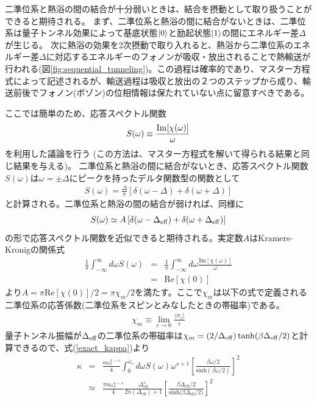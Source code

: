 二準位系と熱浴の間の結合が十分弱いときは、結合を摂動として取り扱うことができると期待される。
まず、二準位系と熱浴の間に結合がないときは、二準位系は量子トンネル効果によって基底状態$\ket{0}$と励起状態$\ket{1}$の間にエネルギー差$\Delta$が生じる。
次に熱浴の効果を2次摂動で取り入れると、熱浴から二準位系のエネルギー差$\Delta$に対応するエネルギーのフォノンが吸収・放出されることで熱輸送が行われる(図\ref{fig:sequential_tunneling})。この過程は確率的であり、マスター方程式によって記述される\cite{Ruokola11}が、輸送過程は吸収と放出の２つのステップから成り、輸送前後でフォノン(ボゾン)の位相情報は保たれていない点に留意すべきである。

ここでは簡単のため、応答スペクトル関数
\begin{eqnarray}
S(\omega) \equiv \frac{{\rm Im}[\chi(\omega)]}{\omega}
\end{eqnarray}
を利用した議論を行う
(この方法は、マスター方程式を解いて得られる結果と同じ結果を与える)。
二準位系と熱浴の間に結合がないとき、応答スペクトル関数$S(\omega)$は$\omega=\pm\Delta$にピークを持ったデルタ関数型の関数として
\begin{eqnarray}
	S(\omega) = \frac{\Delta}{\pi} \left[\delta(\omega-\Delta)+\delta(\omega+\Delta) \right]
\end{eqnarray}
と計算される。二準位系と熱浴の間の結合が弱ければ、同様に
\begin{eqnarray}
	S(\omega) \simeq A \left[\delta(\omega-\Delta_{\rm eff})+\delta(\omega+\Delta_{\rm eff})\right]
\end{eqnarray}
の形で応答スペクトル関数を近似できると期待される。実定数$A$はKramers-Kronigの関係式
\begin{eqnarray}
	\frac{1}{\pi}\int_{-\infty}^{\infty}d\omega S(\omega)&=&\frac{1}{\pi}\int_{-\infty}^{\infty}d\omega \frac{\mathrm{Im}[\chi(\omega)]}{\omega}\\
&=&\mathrm{Re}[\chi(0)]
	\label{Kramers-Kronig}
\end{eqnarray}
より$A=\pi\mathrm{Re}[\chi(0)]/2=\pi\chi_m/2$を満たす。ここで$\chi_m$は以下の式で定義される
二準位系の応答係数(二準位系をスピンとみなしたときの帯磁率)である。
\begin{eqnarray}
\chi_m \equiv \lim_{\epsilon \rightarrow 0} \frac{\langle \sigma_z \rangle}{\epsilon}
\label{chimdef}
\end{eqnarray}
量子トンネル振幅が$\Delta_{\rm eff}$の二準位系の帯磁率は$\chi_m = (2/\Delta_{\rm eff}) \tanh(\beta \Delta_{\rm eff}/2)$と計算できるので、式(\ref{exact_kappa})より
\begin{eqnarray}
	\kappa&=&\frac{\alpha\omega_c^{1-s}}{4}\int_{0}^{\omega_{c}}d\omega S(\omega)\omega^{s+1}\left[\frac{\beta\omega/2}{\mathrm{sinh}{(\beta\omega/2)}}\right]^{2}\\
	&\simeq& \frac{\pi\alpha\omega_c^{1-s}}{4}\frac{ \Delta_{\mathrm{eff}}^{s}}{2n(\Delta_{\mathrm{eff}})+1}\left[\frac{\beta\Delta_{\mathrm{eff}}/2}{\mathrm{sinh}{(\beta\Delta_{\mathrm{eff}}/2})}\right]^{2}
	\label{compare_ruokola2}
\end{eqnarray}
